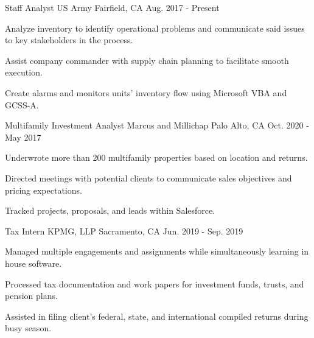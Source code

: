 

\begin{cventries}

  \cventry
    {Staff Analyst} %
    {US Army} %
    {Fairfield, CA} %
    {Aug. 2017 - Present} %
    {
      \begin{cvitems} %
        \item {Analyze inventory to identify operational problems and 
                communicate said issues to key stakeholders in the process. 
                }
        \item {Assist company commander with supply chain planning to facilitate smooth execution. 
                }
        \item {Create alarms and monitors units' inventory flow using Microsoft VBA and GCSS-A.}
        {}
      \end{cvitems}
    }

  \cventry
    {Multifamily Investment Analyst} %
    {Marcus and Millichap} %
    {Palo Alto, CA} %
    {Oct. 2020 - May 2017} %
    {
      \begin{cvitems} %
        \item {Underwrote more than 200 multifamily properties based on location and returns.}
        \item {Directed meetings with potential clients to communicate sales 
                objectives and pricing expectations. 
                }
        \item {Tracked projects, proposals, and leads within Salesforce.}
        {}
      \end{cvitems}
    }

  \cventry
    {Tax Intern} %
    {KPMG, LLP} %
    {Sacramento, CA} %
    {Jun. 2019 - Sep. 2019} %
    {
      \begin{cvitems} %
        \item {Managed multiple engagements and assignments while simultaneously learning in house software.}
        \item {Processed tax documentation and work papers for investment funds, trusts, and pension plans.}
        \item {Assisted in filing client’s federal, state, and international compiled returns during busy season.}
      \end{cvitems}
    }

\end{cventries}
